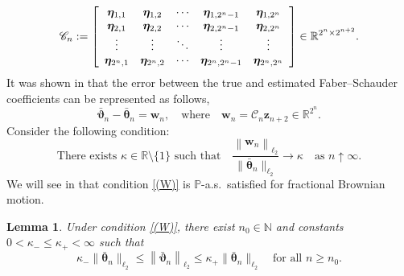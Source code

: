 \documentclass[12pt,reqno]{article}
\newcommand{\norm}[1]{\left\lVert {#1}\right\rVert}
\def\lra{\longrightarrow}
\def\ua{\uparrow}
\numberwithin{equation}{section}
\newtheorem{lemma}[theorem]{Lemma}
\theoremstyle{definition}
\def\lra{\longrightarrow}
\def\lra{\longrightarrow}
\def\ua{\uparrow}
\newcommand{\bR}{\mathbb{R}}
\newcommand{\bN}{\mathbb{N}}
\newcommand{\bP}{\mathbb{P}}
\begin{document}
\begin{equation}\label{eq Cm}
\mathscr{C}_n := \left[
\begin{array}{c c c c c}
\bm \eta_{1,1} & \bm \eta_{1,2} &\cdots  & \bm \eta_{1,2^n-1}  & \bm \eta_{1,2^n}\\
\bm \eta_{2,1} & \bm \eta_{2,2} &\cdots  & \bm \eta_{2,2^n-1}  & \bm \eta_{2,2^n}\\
\vdots & \vdots & \ddots& \vdots & \vdots \\
\bm \eta_{2^n,1} & \bm \eta_{2^n,2} &\cdots  & \bm \eta_{2^n,2^n-1}  & \bm \eta_{2^n,2^n}\\
\end{array}
\right] \in \bR^{2^n \times 2^{n+2}}.
\end{equation}
It was shown in \cite[Lemma 3.1 and  3.2]{HanSchiedMatrix} that the error between the true and estimated Faber--Schauder coefficients can be represented as follows,
\begin{equation}\label{eq vector w}
\bar{\bm\vartheta}_n-\bar{\bm\theta}_n=\bm w_n, \quad\text{where}\quad \bm w_n = \mathscr{C}_n \bm z_{n+2}\in\bR^{2^n}.
\end{equation}
Consider the following condition: 
\begin{equation}\label{(W)}
\text{There exists $\kappa\in\bR\setminus\{1\}$ such that}\quad \frac{\norm{\bm w_n}_{\ell_2}}{\|\bar{\bm \theta}_n\|_{\ell_2}}\lra \kappa\quad\text{as $n\ua\infty$.}
\end{equation}
We will see in  that condition \eqref{(W)} is $\bP$-a.s.~satisfied for fractional Brownian motion. 

\begin{lemma}\label{gamma vs sn lemma}
 Under condition \eqref{(W)}, there exist $n_0\in\bN$ and constants $0<\kappa_-\le\kappa_+<\infty$ such that 
\begin{equation}\label{gamma vs sn eq}
 \kappa_-\|\bar{\bm \theta}_n\|_{\ell_2}\le \norm{\bar{\bm \vartheta}_n}_{\ell_2} \le  \kappa_+\|\bar{\bm \theta}_n\|_{\ell_2}\quad\text{for all $n\ge n_0$.}
\end{equation}
\end{lemma}
\end{document}
